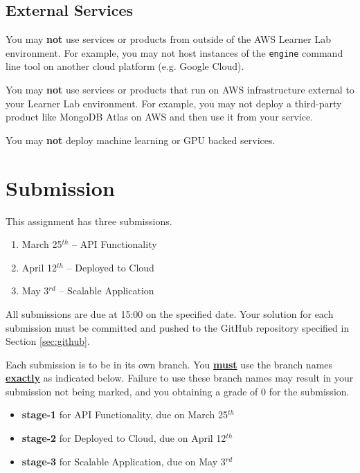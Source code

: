 \documentclass{csse4400}
\begin{document}
\subsection{External Services}
You may \textbf{not} use services or products from outside of the AWS Learner Lab environment.
For example, you may not host instances of the \texttt{engine} command line tool on another cloud platform
(e.g. Google Cloud).

You may \textbf{not} use services or products that run on AWS infrastructure external to your Learner Lab environment.
For example, you may not deploy a third-party product like MongoDB Atlas on AWS and then use it from your service.

You may \textbf{not} deploy machine learning or GPU backed services.


\section{Submission}
This assignment has three submissions.

\begin{enumerate}[topsep=7pt,partopsep=2pt,itemsep=4pt,parsep=4pt]
  \item March 25$^{th}$ -- API Functionality
  \item April 12$^{th}$ -- Deployed to Cloud
  \item May 3$^{rd}$ -- Scalable Application
\end{enumerate}
All submissions are due at 15:00 on the specified date.
Your solution for each submission must be committed and pushed to the GitHub repository specified in Section \ref{sec:github}.

Each submission is to be in its own branch.
You \textbf{\underline{must}} use the branch names \textbf{\underline{exactly}} as indicated below.
Failure to use these branch names may result in your submission not being marked,
and you obtaining a grade of 0 for the submission.
\begin{itemize}[topsep=7pt,partopsep=2pt,itemsep=4pt,parsep=4pt]
  \item \textbf{stage-1} for API Functionality, due on March 25$^{th}$
  \item \textbf{stage-2} for Deployed to Cloud, due on April 12$^{th}$
  \item \textbf{stage-3} for Scalable Application, due on May 3$^{rd}$
\end{itemize}
\end{document}

